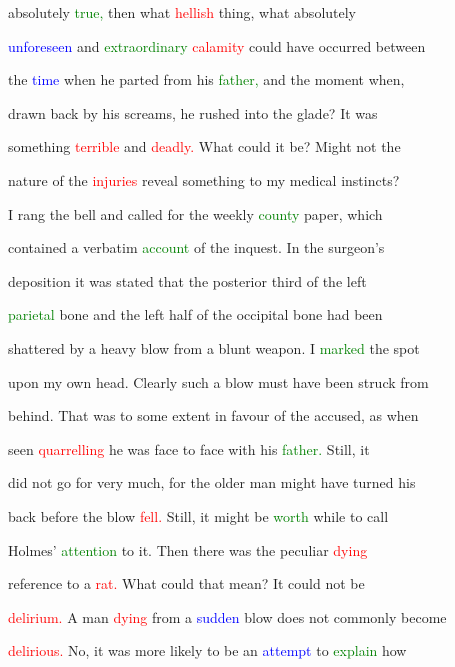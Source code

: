  absolutely \textcolor{green}{true,} then what \textcolor{red}{hellish} thing, what absolutely

 \textcolor{blue}{unforeseen} and \textcolor{green}{extraordinary} \textcolor{red}{calamity} could have occurred between

 the \textcolor{blue}{time} when he parted from his \textcolor{green}{father,} and the moment when,

 drawn back by his \textcolor{BurntOrange}{screams,} he rushed into the glade? It was

 something \textcolor{red}{terrible} and \textcolor{red}{deadly.} What could it be? Might not the

 nature of the \textcolor{red}{injuries} reveal something to my \textcolor{BurntOrange}{medical} instincts?

 I rang the bell and called for the weekly \textcolor{green}{county} paper, which

 contained a verbatim \textcolor{green}{account} of the inquest. In the surgeon's

 deposition it was stated that the posterior third of the left

 \textcolor{green}{parietal} bone and the left half of the occipital bone had been

 \textcolor{BurntOrange}{shattered} by a heavy blow from a blunt weapon. I \textcolor{green}{marked} the spot

 upon my own head. Clearly such a blow must have been struck from

 behind. That was to some extent in favour of the accused, as when

 seen \textcolor{red}{quarrelling} he was face to face with his \textcolor{green}{father.} Still, it

 did not go for very much, for the older man might have turned his

 back before the blow \textcolor{red}{fell.} Still, it might be \textcolor{green}{worth} while to call

 Holmes' \textcolor{green}{attention} to it. Then there was the peculiar \textcolor{red}{dying}

 reference to a \textcolor{red}{rat.} What could that mean? It could not be

 \textcolor{red}{delirium.} A man \textcolor{red}{dying} from a \textcolor{blue}{sudden} blow does not commonly become

 \textcolor{red}{delirious.} No, it was more likely to be an \textcolor{blue}{attempt} to \textcolor{green}{explain} how

